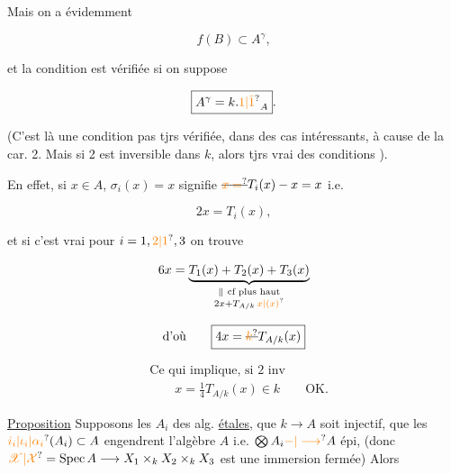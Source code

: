 Mais on a évidemment

\[
 f(B)\subset A^\gamma,
\]

et la condition est vérifiée si on suppose

\[
 \boxed{A^\gamma=k.\unsure{1|\bar 1}_A}.
\]

(C'est là une condition pas tjrs vérifiée,  dans des cas intéressants, à cause de la car. 2. Mais si 2 est inversible \deleted{\unsure{,}} dans $k$, alors tjrs vrai  des conditions ).


En effet, si $x\in A$, $\sigma_i(x)=x$ signifie $\deleted{\unsure{x=}}T_i(x)-x=x$ i.e.

\[
 2x=T_i(x),
\]

et si c'est vrai pour $i=1,\unsure{2|1},3$ on trouve

\[
 6x=\underbrace{T_1(x)+T_2(x)+T_3(x)}_{\substack{\Vert\ \text{cf plus haut}\\ 2x+T_{A/k}\,\unsure{x|(x)}}}
\]

\[
 \text{d'où}\qquad\boxed{4x=\deleted{\unsure{k}}T_{A/k}(x)}
\]

\[
 \begin{aligned}
 &\text{Ce qui implique, si 2 inv}\\
 &\qquad x=\frac14 T_{A/k}(x)\in k\qquad\text{OK.}
 \end{aligned}
\]


\uline{Proposition} Supposons les $A_i$ des alg.  \uline{étales}, que $k\longrightarrow A$ soit injectif, que les $\unsure{i_i|\iota_i|\alpha_i}(A_i)\subset A$ engendrent l'algèbre $A$ i.e. $\bigotimes A_i\unsure{\mathord{-}|\longrightarrow}A$ épi, (donc $\unsure{\mathscr X|\mathcal X}=\operatorname{Spec} A\longrightarrow X_1\times_k X_2\times_k X_3$ est une immersion fermée) Alors    

